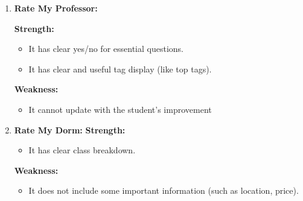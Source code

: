 \documentclass[12pt]{article}
\begin{document}
\begin{enumerate}
    \item \textbf{Rate My Professor: }
    
    \textbf{Strength: }

    \begin{itemize}
        \item It has clear yes/no for essential questions.
        \item It has clear and useful tag display (like top tags).
    \end{itemize}
    \textbf{Weakness: }
    \begin{itemize}
        \item It cannot update with the student’s improvement
    \end{itemize}

    \item \textbf{Rate My Dorm: }
    \textbf{Strength: }
    \begin{itemize}
        \item It has clear class breakdown.
    \end{itemize}
    \textbf{Weakness: }
    \begin{itemize}
        \item It does not include some important information (such as location, price).
\end{itemize}
\end{enumerate}
\end{document}
